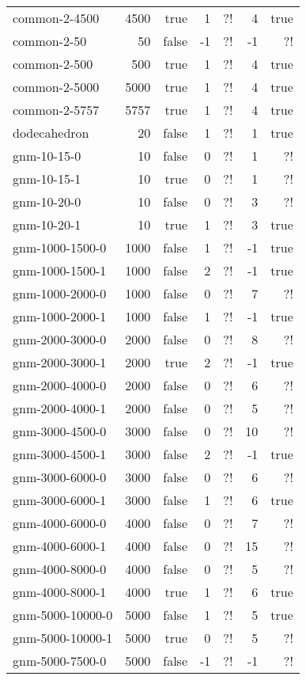 \begin{longtable}{lrrrrrr}
	common-2-4500 & 4500 & true & 1 & ?! & 4 & true\\
	common-2-50 & 50 & false & -1 & ?! & -1 & ?!\\
	common-2-500 & 500 & true & 1 & ?! & 4 & true\\
	common-2-5000 & 5000 & true & 1 & ?! & 4 & true\\
	common-2-5757 & 5757 & true & 1 & ?! & 4 & true\\
	dodecahedron & 20 & false & 1 & ?! & 1 & true\\
	gnm-10-15-0 & 10 & false & 0 & ?! & 1 & ?!\\
	gnm-10-15-1 & 10 & true & 0 & ?! & 1 & ?!\\
	gnm-10-20-0 & 10 & false & 0 & ?! & 3 & ?!\\
	gnm-10-20-1 & 10 & true & 1 & ?! & 3 & true\\
	gnm-1000-1500-0 & 1000 & false & 1 & ?! & -1 & true\\
	gnm-1000-1500-1 & 1000 & false & 2 & ?! & -1 & true\\
	gnm-1000-2000-0 & 1000 & false & 0 & ?! & 7 & ?!\\
	gnm-1000-2000-1 & 1000 & false & 1 & ?! & -1 & true\\
	gnm-2000-3000-0 & 2000 & false & 0 & ?! & 8 & ?!\\
	gnm-2000-3000-1 & 2000 & true & 2 & ?! & -1 & true\\
	gnm-2000-4000-0 & 2000 & false & 0 & ?! & 6 & ?!\\
	gnm-2000-4000-1 & 2000 & false & 0 & ?! & 5 & ?!\\
	gnm-3000-4500-0 & 3000 & false & 0 & ?! & 10 & ?!\\
	gnm-3000-4500-1 & 3000 & false & 2 & ?! & -1 & true\\
	gnm-3000-6000-0 & 3000 & false & 0 & ?! & 6 & ?!\\
	gnm-3000-6000-1 & 3000 & false & 1 & ?! & 6 & true\\
	gnm-4000-6000-0 & 4000 & false & 0 & ?! & 7 & ?!\\
	gnm-4000-6000-1 & 4000 & false & 0 & ?! & 15 & ?!\\
	gnm-4000-8000-0 & 4000 & false & 0 & ?! & 5 & ?!\\
	gnm-4000-8000-1 & 4000 & true & 1 & ?! & 6 & true\\
	gnm-5000-10000-0 & 5000 & false & 1 & ?! & 5 & true\\
	gnm-5000-10000-1 & 5000 & true & 0 & ?! & 5 & ?!\\
	gnm-5000-7500-0 & 5000 & false & -1 & ?! & -1 & ?!\\

\end{longtable}
